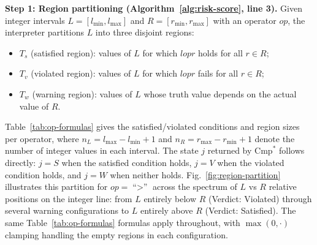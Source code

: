 \documentclass[pdflatex,sn-basic]{sn-jnl}%
\theoremstyle{thmstyleone}%
\theoremstyle{thmstyletwo}%
\theoremstyle{thmstylethree}%
\begin{document}
\smallskip
\noindent\textbf{Step 1: Region partitioning (Algorithm~\ref{alg:risk-score}, line 3).}
Given integer intervals $L = [l_{\min}, l_{\max}]$ and $R = [r_{\min}, r_{\max}]$ with an operator $op$, the interpreter partitions $L$ into three disjoint regions:
\begin{itemize}
    \item $T_s$ (satisfied region): values of $L$ for which $l \mathrel{op} r$ holds for all $r \in R$;
    \item $T_v$ (violated region): values of $L$ for which $l \mathrel{op} r$ fails for all $r \in R$;
    \item $T_w$ (warning region): values of $L$ whose truth value depends on the actual value of $R$.
\end{itemize}

Table~\ref{tab:op-formulas} gives the satisfied/violated conditions and region sizes per operator, where $n_L = l_{\max} - l_{\min} + 1$ and $n_R = r_{\max} - r_{\min} + 1$ denote the number of integer values in each interval.
The state $j$ returned by $\text{Cmp}^*$ follows directly: $j = S$ when the satisfied condition holds, $j = V$ when the violated condition holds, and $j = W$ when neither holds.
Fig.~\ref{fig:region-partition} illustrates this partition for $op = \text{``$>$''}$ across the spectrum of $L$ vs $R$ relative positions on the integer line: from $L$ entirely below $R$ (Verdict: Violated) through several warning configurations to $L$ entirely above $R$ (Verdict: Satisfied). The same Table~\ref{tab:op-formulas} formulas apply throughout, with $\max(0, \cdot)$ clamping handling the empty regions in each configuration.
\end{document}
